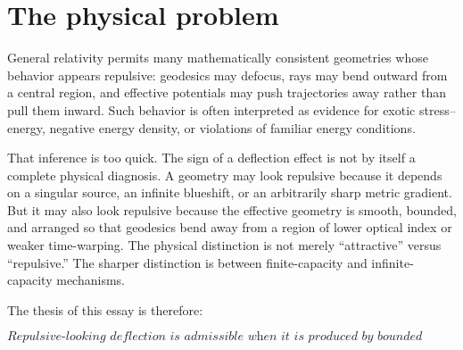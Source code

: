 \documentclass[11pt]{article}
\begin{document}
\begin{abstract}
Repulsive-looking gravitational deflection is often associated with exotic matter, negative energy density, or violations of classical energy conditions.  This essay proposes a different diagnostic: physical realizability should require finite operational capacity.  A realizable geometry should not demand unbounded information transport, unbounded gradient amplification, or infinite observational resolution.  Using optical metrics as exact analogue geometries, we show that outward geodesic deflection can occur in smooth bounded geometries with finite gradients and finite bandwidth.  The resulting selection rule is not that outward deflection is forbidden, but that deflection mechanisms requiring infinite amplification are inadmissible.  A simple finite-capacity inequality separates bounded repulsive deflection from singular or unstable constructions and provides a practical criterion for semiclassical model building.
\end{abstract}

\section{The physical problem}

General relativity permits many mathematically consistent geometries whose behavior appears repulsive: geodesics may defocus, rays may bend outward from a central region, and effective potentials may push trajectories away rather than pull them inward.  Such behavior is often interpreted as evidence for exotic stress--energy, negative energy density, or violations of familiar energy conditions.

That inference is too quick.  The sign of a deflection effect is not by itself a complete physical diagnosis.  A geometry may look repulsive because it depends on a singular source, an infinite blueshift, or an arbitrarily sharp metric gradient.  But it may also look repulsive because the effective geometry is smooth, bounded, and arranged so that geodesics bend away from a region of lower optical index or weaker time-warping.  The physical distinction is not merely ``attractive'' versus ``repulsive.''  The sharper distinction is between finite-capacity and infinite-capacity mechanisms.

The thesis of this essay is therefore:

\[
\textit{Repulsive-looking deflection is admissible when it is produced by bounded geometry rather than infinite operational gain.}
\]
\end{document}
